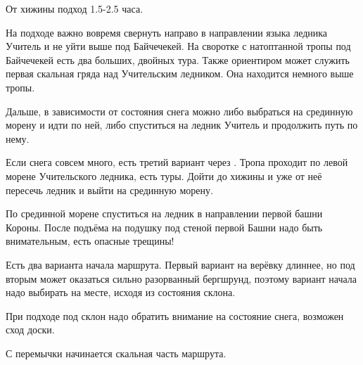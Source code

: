 От хижины \geoLighthouse{} подход 1.5-2.5 часа.

На подходе важно вовремя свернуть направо в направлении языка ледника Учитель и не уйти выше под Байчечекей. На своротке с натоптанной тропы
под Байчечекей есть два больших, двойных тура. Также ориентиром может служить первая скальная гряда над Учительским ледником. Она находится
немного выше тропы.

Дальше, в зависимости от состояния снега можно либо выбраться на срединную морену и идти по ней, либо спуститься на ледник Учитель и
продолжить путь по нему.

Если снега совсем много, есть третий вариант через . Тропа проходит по левой морене Учительского ледника,
есть туры. Дойти до хижины и уже от неё пересечь ледник и выйти на срединную морену.

По срединной морене спуститься на ледник в направлении первой башни Короны. После подъёма на подушку под стеной первой Башни надо быть
внимательным, есть опасные трещины!

Есть два варианта начала маршрута. Первый вариант на верёвку длиннее, но под вторым может оказаться сильно разорванный бергшрунд, поэтому
вариант начала надо выбирать на месте, исходя из состояния склона.

При подходе под склон надо обратить внимание на состояние снега, возможен сход доски.



С перемычки начинается скальная часть маршрута.


